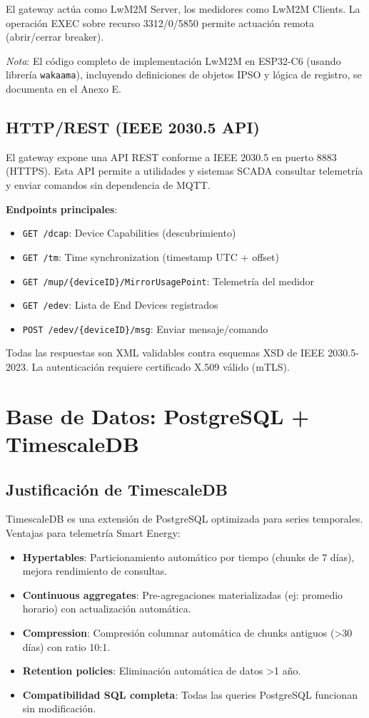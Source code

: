 El gateway actúa como LwM2M Server, los medidores como LwM2M Clients. La operación EXEC sobre recurso 3312/0/5850 permite actuación remota (abrir/cerrar breaker).

\textit{Nota}: El código completo de implementación LwM2M en ESP32-C6 (usando librería \texttt{wakaama}), incluyendo definiciones de objetos IPSO y lógica de registro, se documenta en el Anexo E.

\subsection{HTTP/REST (IEEE 2030.5 API)}

El gateway expone una API REST conforme a IEEE 2030.5 en puerto 8883 (HTTPS). Esta API permite a utilidades y sistemas SCADA consultar telemetría y enviar comandos sin dependencia de MQTT.

\textbf{Endpoints principales}:
\begin{itemize}
    \item \texttt{GET /dcap}: Device Capabilities (descubrimiento)
    \item \texttt{GET /tm}: Time synchronization (timestamp UTC + offset)
    \item \texttt{GET /mup/\{deviceID\}/MirrorUsagePoint}: Telemetría del medidor
    \item \texttt{GET /edev}: Lista de End Devices registrados
    \item \texttt{POST /edev/\{deviceID\}/msg}: Enviar mensaje/comando
\end{itemize}

Todas las respuestas son XML validables contra esquemas XSD de IEEE 2030.5-2023. La autenticación requiere certificado X.509 válido (mTLS).

\section{Base de Datos: PostgreSQL + TimescaleDB}

\subsection{Justificación de TimescaleDB}

TimescaleDB es una extensión de PostgreSQL optimizada para series temporales. Ventajas para telemetría Smart Energy:

\begin{itemize}
    \item \textbf{Hypertables}: Particionamiento automático por tiempo (chunks de 7 días), mejora rendimiento de consultas.
    \item \textbf{Continuous aggregates}: Pre-agregaciones materializadas (ej: promedio horario) con actualización automática.
    \item \textbf{Compression}: Compresión columnar automática de chunks antiguos (>30 días) con ratio 10:1.
    \item \textbf{Retention policies}: Eliminación automática de datos >1 año.
    \item \textbf{Compatibilidad SQL completa}: Todas las queries PostgreSQL funcionan sin modificación.
\end{itemize}

